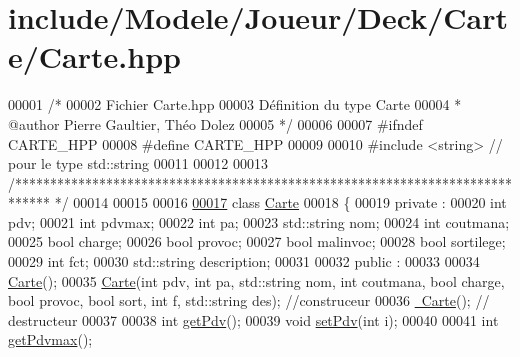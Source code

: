 \hypertarget{_carte_8hpp_source}{\section{include/\-Modele/\-Joueur/\-Deck/\-Carte/\-Carte.hpp}
}

\begin{DoxyCode}
00001 \textcolor{comment}{/* }
00002 \textcolor{comment}{   Fichier Carte.hpp}
00003 \textcolor{comment}{   Définition du type Carte}
00004 \textcolor{comment}{* @author Pierre Gaultier, Théo Dolez}
00005 \textcolor{comment}{*/}
00006 
00007 \textcolor{preprocessor}{#ifndef CARTE\_HPP}
00008 \textcolor{preprocessor}{}\textcolor{preprocessor}{#define CARTE\_HPP}
00009 \textcolor{preprocessor}{}
00010 \textcolor{preprocessor}{#include <string>} \textcolor{comment}{// pour le type std::string}
00011 
00012 
00013 \textcolor{comment}{/*****************************************************************************
      */}
00014 
00015 
00016 
\hypertarget{_carte_8hpp_source_l00017}{}\hyperlink{class_carte}{00017} \textcolor{keyword}{class }\hyperlink{class_carte}{Carte}
00018 \{
00019    \textcolor{keyword}{private} :
00020    \textcolor{keywordtype}{int} pdv;
00021    \textcolor{keywordtype}{int} pdvmax;
00022    \textcolor{keywordtype}{int} pa;
00023    std::string nom;
00024    \textcolor{keywordtype}{int} coutmana;
00025    \textcolor{keywordtype}{bool} charge;
00026    \textcolor{keywordtype}{bool} provoc;
00027    \textcolor{keywordtype}{bool} malinvoc;
00028    \textcolor{keywordtype}{bool} sortilege;
00029    \textcolor{keywordtype}{int} fct;
00030    std::string description;   
00031    
00032    \textcolor{keyword}{public} :
00033 
00034     \hyperlink{class_carte_a06daaca86c31c80f8308f4a81d46dc9b}{Carte}();
00035     \hyperlink{class_carte_a06daaca86c31c80f8308f4a81d46dc9b}{Carte}(\textcolor{keywordtype}{int} pdv, \textcolor{keywordtype}{int} pa, std::string nom, \textcolor{keywordtype}{int} coutmana, \textcolor{keywordtype}{bool} charge, \textcolor{keywordtype}{bool} 
      provoc, \textcolor{keywordtype}{bool} sort, \textcolor{keywordtype}{int} f, std::string des); \textcolor{comment}{//construceur}
00036     \hyperlink{class_carte_a63300ff55c58b5d5b1674a3fc8f25910}{~Carte}(); \textcolor{comment}{// destructeur}
00037 
00038     \textcolor{keywordtype}{int} \hyperlink{class_carte_a657918ef04b48d042985550cc9531b96}{getPdv}();
00039       \textcolor{keywordtype}{void} \hyperlink{class_carte_a002eabf379874c8a989d0ee4469074d0}{setPdv}(\textcolor{keywordtype}{int} i);
00040   
00041     \textcolor{keywordtype}{int} \hyperlink{class_carte_a3d71e111f10666ca64f94c48ca2f215f}{getPdvmax}();

\end{DoxyCode}

